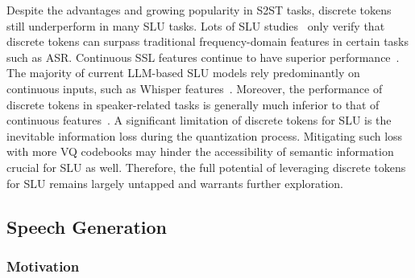 Despite the advantages and growing popularity in S2ST tasks, discrete tokens still underperform in many SLU tasks. 
Lots of SLU studies~\cite{puvvada2024discrete, chang2024exploring, shon2024discreteslu, cui2024exploring_context, cui2024exploring} only verify that discrete tokens can surpass traditional frequency-domain features in certain tasks such as ASR. 
Continuous SSL features continue to have superior performance~\cite{wang2024comparative}. 
The majority of current LLM-based SLU models rely predominantly on continuous inputs, such as Whisper features~\cite{gong2023joint,chu2023qwen,tang2024salmonn,wavllm,ma2024embarrassingly,bai2024seed}.
Moreover, the performance of discrete tokens in speaker-related tasks is generally much inferior to that of continuous features~\cite{puvvada2024discrete,mousavi2024dasb}.
A significant limitation of discrete tokens for SLU is the inevitable information loss during the quantization process.
Mitigating such loss with more VQ codebooks may hinder the accessibility of semantic information crucial for SLU as well.
Therefore, the full potential of leveraging discrete tokens for SLU remains largely untapped and warrants further exploration.

\subsection{Speech Generation}
\label{sec:application-synthesis}

\subsubsection{Motivation}

